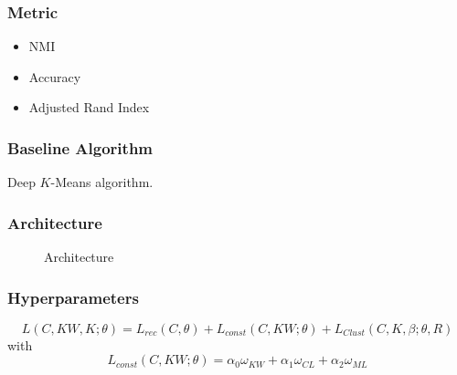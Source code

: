 \documentclass{beamer}
\begin{document}
\begin{frame}
\frametitle{Metric}
\begin{itemize}
\item NMI
\item Accuracy
\item Adjusted Rand Index
\end{itemize}
\end{frame}

\begin{frame}
\frametitle{Baseline Algorithm}
Deep $K$-Means algorithm.
\end{frame}

\begin{frame}
\frametitle{Architecture}
\begin{figure}[!h]
  \centering
  \caption{\label{fig:archi}Architecture}
\end{figure}
\end{frame}

\begin{frame}
\frametitle{Hyperparameters}
\begin{equation*}
L(C,KW, K; \theta) = L_{rec}(C, \theta) + L_{const}(C, KW;\theta) + L_{Clust}(C, K, \beta; \theta, R)
\end{equation*}
with
\begin{equation*}
L_{const}(C, KW;\theta) = \alpha_0\omega_{KW} + \alpha_1\omega_{CL} + \alpha_2\omega_{ML}
\end{equation*}
\begin{table}[!h]
\centering
{}
\end{table}
\end{frame}
\end{document}
